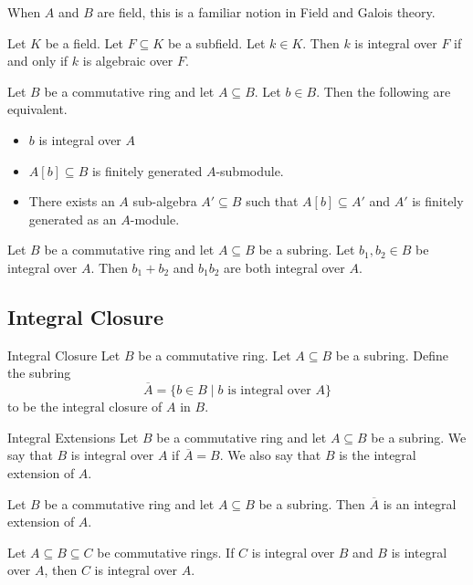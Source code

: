 \documentclass[a4paper]{article}
\begin{document}
When $A$ and $B$ are field, this is a familiar notion in Field and Galois theory. 

\begin{lmm}{}{} Let $K$ be a field. Let $F\subseteq K$ be a subfield. Let $k\in K$. Then $k$ is integral over $F$ if and only if $k$ is algebraic over $F$. 
\end{lmm}

\begin{prp}{}{} Let $B$ be a commutative ring and let $A\subseteq B$. Let $b\in B$. Then the following are equivalent. 
\begin{itemize}
\item $b$ is integral over $A$
\item $A[b]\subseteq B$ is finitely generated $A$-submodule. 
\item There exists an $A$ sub-algebra $A'\subseteq B$ such that $A[b]\subseteq A'$ and $A'$ is finitely generated as an $A$-module. 
\end{itemize}
\end{prp}

\begin{prp}{}{} Let $B$ be a commutative ring and let $A\subseteq B$ be a subring. Let $b_1,b_2\in B$ be integral over $A$. Then $b_1+b_2$ and $b_1b_2$ are both integral over $A$. 
\end{prp}

\subsection{Integral Closure}
\begin{defn}{Integral Closure}{} Let $B$ be a commutative ring. Let $A\subseteq B$ be a subring. Define the subring $$\overline{A}=\{b\in B\;|\;b\text{ is integral over }A\}$$ to be the integral closure of $A$ in $B$. 
\end{defn}

\begin{defn}{Integral Extensions}{} Let $B$ be a commutative ring and let $A\subseteq B$ be a subring. We say that $B$ is integral over $A$ if $\overline{A}=B$. We also say that $B$ is the integral extension of $A$. 
\end{defn}

\begin{lmm}{}{} Let $B$ be a commutative ring and let $A\subseteq B$ be a subring. Then $\overline{A}$ is an integral extension of $A$. 
\end{lmm}

\begin{lmm}{}{} Let $A\subseteq B\subseteq C$ be commutative rings. If $C$ is integral over $B$ and $B$ is integral over $A$, then $C$ is integral over $A$. 
\end{lmm}
\end{document}
